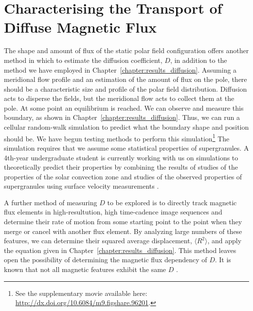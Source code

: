 


\section{Characterising the Transport of Diffuse Magnetic Flux}

The shape and amount of flux of the static polar field configuration offers another method in which to estimate the diffusion coefficient, $D$, in addition to the method we have employed in Chapter~\ref{chapter:results_diffusion}. Assuming a meridional flow profile and an estimation of the amount of flux on the pole, there should be a characteristic size and profile of the polar field distribution. Diffusion acts to disperse the fields, but the meridional flow acts to collect them at the pole. At some point an equilibrium is reached. We can observe and measure this boundary, as shown in  Chapter~\ref{chapter:results_diffusion}. Thus, we can run a cellular random-walk simulation to predict what the boundary shape and position should be. We have begun testing methods to perform this simulation\footnote{See the supplementary movie available here: \url{http://dx.doi.org/10.6084/m9.figshare.96201}.} The simulation requires that we assume some statistical properties of supergranules. A 4th-year undergraduate student is currently working with us on simulations to theoretically predict their properties by combining the results of studies of the properties of the solar convection zone \citep{Bahcall:1992} and studies of the observed properties of supergranules using surface velocity measurements \citep{Hathaway:2000}.

A further method of measuring $D$ to be explored is to directly track magnetic flux elements in high-resultution, high time-cadence image sequences and determine their rate of motion from some starting point to the point when they merge or cancel with another flux element. By analyzing large numbers of these features, we can determine their squared average displacement, $\langle R^2 \rangle$, and apply the equation given in Chapter~\ref{chapter:results_diffusion}. This method leaves open the possibility of determining the magnetic flux dependency of $D$. It is known that not all magnetic features exhibit the same $D$ \citep{Schrijver:1996}.

